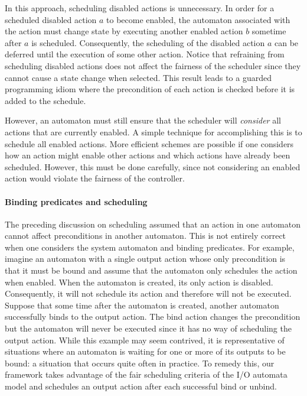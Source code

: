 In this approach, scheduling disabled actions is unnecessary.
In order for a scheduled disabled action $a$ to become enabled, the automaton associated with the action must change state by executing another enabled action $b$ sometime after $a$ is scheduled.
Consequently, the scheduling of the disabled action $a$ can be deferred until the execution of some other action.
Notice that refraining from scheduling disabled actions does not affect the fairness of the scheduler since they cannot cause a state change when selected.
This result leads to a guarded programming idiom where the precondition of each action is checked before it is added to the schedule.

However, an automaton must still ensure that the scheduler will \emph{consider} all actions that are currently enabled.
A simple technique for accomplishing this is to schedule all enabled actions.
More efficient schemes are possible if one considers how an action might enable other actions and which actions have already been scheduled.
However, this must be done carefully, since not considering an enabled action would violate the fairness of the controller.

\paragraph*{Binding predicates and scheduling}
The preceding discussion on scheduling assumed that an action in one automaton cannot affect preconditions in another automaton.
This is not entirely correct when one considers the system automaton and binding predicates.
For example, imagine an automaton with a single output action whose only precondition is that it must be bound and assume that the automaton only schedules the action when enabled.
When the automaton is created, its only action is disabled.
Consequently, it will not schedule its action and therefore will not be executed.
Suppose that some time after the automaton is created, another automaton successfully binds to the output action.
The bind action changes the precondition but the automaton will never be executed since it has no way of scheduling the output action.
While this example may seem contrived, it is representative of situations where an automaton is waiting for one or more of its outputs to be bound: a situation that occurs quite often in practice.
To remedy this, our framework takes advantage of the fair scheduling criteria of the I/O automata model and schedules an output action after each successful bind or unbind.

